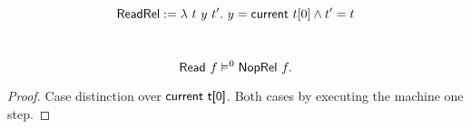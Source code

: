 \[
  \textsf{ReadRel} := \lambda~t~y~t'.~ y = \textsf{current}~t[0] \land t' = t
\]
\begin{lemma}
  \label{lem:Read_Sem}
  ~
  \[
    \textsf{Read}~f \vDash^0 \textsf{NopRel}~f.
  \]
\end{lemma}
\begin{proof}
  Case distinction over $\textsf{current t[0]}$.  Both cases by executing the machine one step.
\end{proof}



